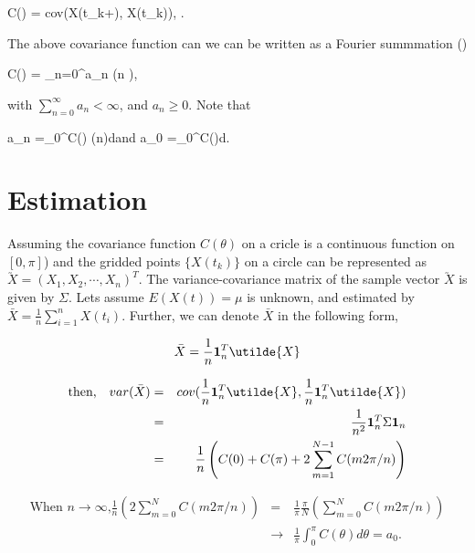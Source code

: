 \beq
C(\theta) = cov(X(t_k+\theta), X(t_k)), \quad \quad \theta \in [0, \pi].
\eeq

The above covariance function can we can be written as a Fourier summmation (\cite{Roy1972})  

\beq
C(\theta) = \sum_{n=0}^\infty a_n \cos(n \theta),
\eeq

with $\sum_{n = 0}^\infty a_n < \infty$, and $a_n \ge 0$. Note that

\beq \nonumber
a_n  =\int_0^\pi C(\theta) \cos(n\theta)d\theta \quad \mbox{and} \quad a_0  =\int_0^\pi C(\theta)d\theta  .
\eeq 




\section{Estimation}



Assuming the covariance function $C(\theta)$ on a cricle is a continuous function on $[0, \pi]$) and the gridded points $\{X(t_k)\}$ on a circle can be represented as $\utilde{X} = (X_1, X_2, \cdots, X_n)^T$. The variance-covariance matrix of the sample vector $\utilde{X} $ is given by $\Sigma$. Lets assume $E(X(t)) = \mu$ is unknown, and estimated by $\bar{X} = \frac{1}{n}\sum_{i=1}^{n} X(t_i)$.  Further, we can denote $\bar{X}$ in the following form,

\[
	\bar{X} = \frac{1}{n}{\bf 1}_n^T \utilde{X}
\]

\begin{eqnarray}
	\mbox{then,} \quad var(\bar{X}) &=& cov(\frac{1}{n}{\bf 1}_n^T \utilde{X}, \frac{1}{n}{\bf 1}_n^T \utilde{X}) \nonumber \\
	&=& \frac{1}{n^2}{\bf 1}_n^T \Sigma {\bf 1}_n \nonumber \\
	&=& \frac{1}{n} \left(C(0)+C(\pi)+2 \sum_{m=1}^{N-1}C(m 2\pi/n)\right) \nonumber
\end{eqnarray}


\begin{eqnarray*}
\mbox{When $n \to \infty$,}	\frac{1}{n} \left(2 \sum_{m=0}^{N}C(m 2\pi/n)\right) &=& \frac{1}{\pi} \frac{\pi}{N} \left( \sum_{m=0}^{N}C(m 2\pi/n)\right) \\ 
	&\to& \frac{1}{\pi} \int_0^\pi C(\theta)d\theta = a_0.
\end{eqnarray*}

